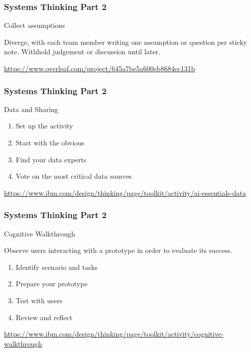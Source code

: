 \newpage
\begin{frame}
\frametitle{ Systems Thinking  Part 2 }
\begin{block}{ Collect assumptions }


Diverge, with each team member writing one assumption or question per sticky note. Withhold judgement or discussion until later.

\url{https://www.overleaf.com/project/645a7be5a600eb8684ec131b}

\end{block}
\end{frame}



\newpage
\begin{frame}
\frametitle{ Systems Thinking  Part 2 }
\begin{block}{ Data and Sharing }

\begin{enumerate}
    \item  Set up the activity
    \item Start with the obvious
    \item  Find your data experts
    \item  Vote on the most critical data sources
\end{enumerate}

\url{https://www.ibm.com/design/thinking/page/toolkit/activity/ai-essentials-data}

\end{block}
\end{frame}



\newpage
\begin{frame}
\frametitle{ Systems Thinking  Part 2 }
\begin{block}{ Cognitive Walkthrough}

Observe users interacting with a prototype in order to evaluate its success.

\begin{enumerate}
    \item   Identify scenario and tasks
    \item  Prepare your prototype
    \item Test with users
    \item  Review and reflect
\end{enumerate}

\url{https://www.ibm.com/design/thinking/page/toolkit/activity/cognitive-walkthrough}

\end{block}
\end{frame}


